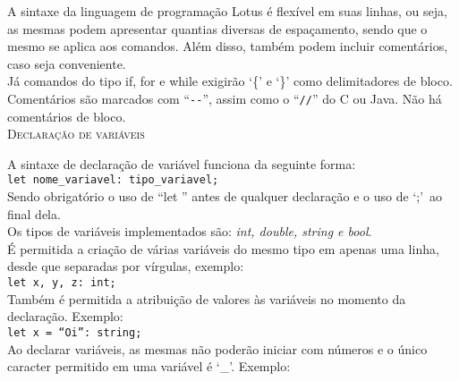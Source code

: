 \documentclass[12pt,a4paper]{article}
\begin{document}
A sintaxe da linguagem de programação Lotus é flexível em suas linhas, ou seja, as mesmas podem apresentar quantias diversas de espaçamento, sendo que o mesmo se aplica aos comandos. Além disso, também podem incluir comentários, caso seja conveniente. \\




Já comandos do tipo if, for e while exigirão `\{' e `\}' como delimitadores de bloco.
Comentários são marcados com ``\texttt{-{}-}'', assim como o ``\texttt{//}'' do C ou Java. Não há comentários de bloco.\\[0.3cm]

\hypertarget{label}{\Large{\textsc{Declaração de variáveis}}}\\
\normalsize

A sintaxe de declaração de variável funciona da seguinte forma:\\

\texttt{let nome\_variavel: tipo\_variavel;}\\

Sendo obrigatório o uso de ``let '' antes de qualquer declaração e o uso de `;'\ ao final dela.\\

Os tipos de variáveis implementados são: \textit{int, double, string e bool}.\\

É permitida a criação de várias variáveis do mesmo tipo em apenas uma linha, desde que separadas por vírgulas, exemplo:\\

\texttt{let x, y, z: int;}\\

Também é permitida a atribuição de valores às variáveis no momento da declaração. Exemplo:\\

\texttt{\noindent let x = ``Oi'': string;}\\

Ao declarar variáveis, as mesmas não poderão iniciar com números e o único caracter permitido em uma variável é `\_'. Exemplo: \\
\end{document}
